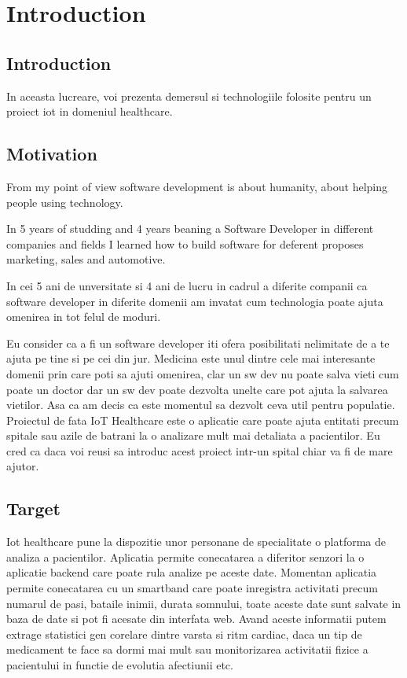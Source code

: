
\chapter{Introduction} %

\label{Introduction} %

\section{Introduction}
In aceasta lucreare, voi prezenta demersul si technologiile folosite pentru un proiect iot in domeniul healthcare.

\section{Motivation}
From my point of view software development is about humanity, about helping people using technology.

In 5 years of studding and 4 years beaning a Software Developer in different companies and fields I learned how to build software for deferent proposes marketing, sales and automotive.

In cei 5 ani de unversitate si 4 ani de lucru in cadrul a diferite companii ca software developer in diferite domenii am invatat cum technologia poate ajuta omenirea in tot felul de moduri.

Eu consider ca a fi un software developer iti ofera posibilitati nelimitate de a te ajuta pe tine si pe cei din jur.
Medicina este unul dintre cele mai interesante domenii prin care poti sa ajuti omenirea, clar un sw dev nu poate salva vieti cum poate un doctor dar un sw dev poate dezvolta unelte care pot ajuta la salvarea vietilor.
Asa ca am decis ca este momentul sa dezvolt ceva util pentru populatie.
Proiectul de fata IoT Healthcare este o aplicatie  care poate ajuta entitati precum spitale sau azile de batrani la o analizare mult mai detaliata a pacientilor. Eu cred ca daca voi reusi sa introduc acest proiect intr-un spital chiar va fi de mare ajutor.


\section{Target}

Iot healthcare pune la dispozitie unor personane de specialitate o platforma de analiza a pacientilor.
Aplicatia permite conecatarea a diferitor senzori la o aplicatie backend care poate rula analize pe aceste date.
Momentan aplicatia permite conecatarea cu un smartband care poate inregistra activitati precum numarul de pasi, bataile inimii, durata somnului, toate aceste date sunt salvate in baza de date si pot fi acesate din interfata web. Avand aceste informatii putem extrage statistici gen corelare dintre varsta si ritm cardiac, daca un tip de medicament te face sa dormi mai mult sau monitorizarea activitatii fizice a pacientului in functie de evolutia afectiunii etc.